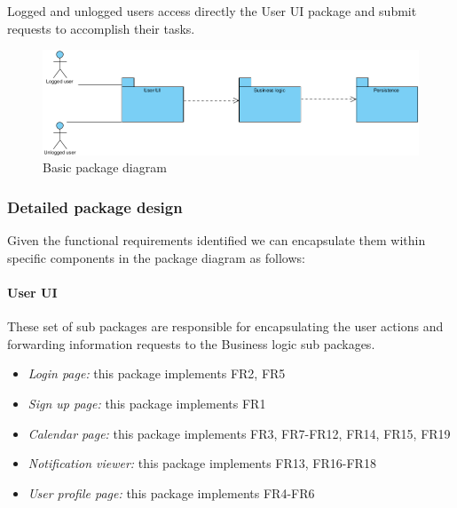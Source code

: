 \documentclass[10pt,a4paper,titlepage]{article}
\begin{document}
Logged and unlogged users access directly the User UI package and submit requests to accomplish their tasks.

\begin{figure}[h!]
\centering
\includegraphics[width=\linewidth]{./images/basic-package}
\caption[Basic package]{Basic package diagram}
\label{fig:basic-package}
\end{figure}

\subsubsection{Detailed package design}
Given the functional requirements identified we can encapsulate them within specific components in the package diagram as follows:

\paragraph{User UI}
These set of sub packages are responsible for encapsulating the user actions and forwarding information requests to the Business logic sub packages.
\begin{itemize}
\item \emph{Login page:} this package implements FR2, FR5
\item \emph{Sign up page:} this package implements FR1
\item \emph{Calendar page:} this package implements FR3, FR7-FR12, FR14, FR15, FR19

\item \emph{Notification viewer:} this package implements FR13, FR16-FR18
\item \emph{User profile page:} this package implements FR4-FR6
\end{itemize}
\end{document}
